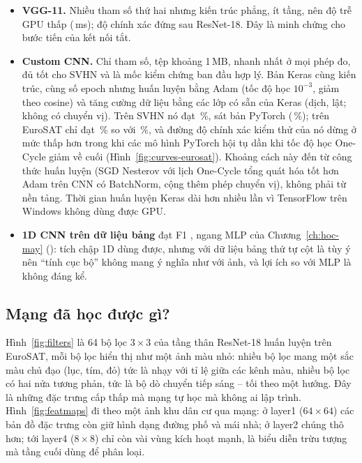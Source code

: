 \begin{itemize}
    \,ms, ResNet-18 cần \,ms. Ít FLOPs không đồng
    nghĩa nhanh hơn trên mọi phần cứng; lợi thế của MobileNet thể hiện ở CPU và thiết bị di động, nơi số phép tính mới là nút thắt.
  \item \textbf{VGG-11.} Nhiều tham số thứ hai nhưng kiến trúc phẳng, ít tầng, nên độ trễ GPU thấp
    (\,ms); độ chính xác đứng sau ResNet-18. Đây là minh chứng cho bước tiến của kết nối tắt.
  \item \textbf{Custom CNN.} Chỉ  tham số, tệp khoảng 1\,MB, nhanh nhất ở mọi phép đo, đủ tốt cho
    SVHN và là mốc kiểm chứng ban đầu hợp lý. Bản Keras cùng kiến trúc, cùng số epoch nhưng huấn luyện bằng Adam (tốc độ học
    $10^{-3}$, giảm theo cosine) và tăng cường dữ liệu bằng các lớp có sẵn của Keras (dịch, lật; không có chuyển vị). Trên SVHN
    nó đạt \,\%, sát bản PyTorch (\,\%); trên EuroSAT chỉ đạt
    \,\% so với \,\%, và đường độ chính xác kiểm thử của nó
    dừng ở mức thấp hơn trong khi các mô hình PyTorch hội tụ dần khi tốc độ học One-Cycle giảm về cuối
    (Hình~\ref{fig:curves-eurosat}). Khoảng cách này đến từ công thức huấn luyện (SGD Nesterov với lịch One-Cycle tổng quát
    hóa tốt hơn Adam trên CNN có BatchNorm, cộng thêm phép chuyển vị), không phải từ nền tảng. Thời gian huấn luyện Keras dài
    hơn nhiều lần vì TensorFlow trên Windows không dùng được GPU.
  \item \textbf{1D CNN trên dữ liệu bảng} đạt F1 , ngang MLP của Chương~\ref{ch:hoc-may}
    (): tích chập 1D dùng được, nhưng với dữ liệu bảng thứ tự cột là tùy ý nên “tính cục bộ”
    không mang ý nghĩa như với ảnh, và lợi ích so với MLP là không đáng kể.
\end{itemize}

\subsection{Mạng đã học được gì?}

Hình~\ref{fig:filters} là 64 bộ lọc $3{\times}3$ của tầng thân ResNet-18 huấn luyện trên EuroSAT, mỗi bộ lọc hiển thị như một
ảnh màu nhỏ: nhiều bộ lọc mang một sắc màu chủ đạo (lục, tím, đỏ) tức là nhạy với tỉ lệ giữa các kênh màu, nhiều bộ lọc có
hai nửa tương phản, tức là bộ dò chuyển tiếp sáng -- tối theo một hướng. Đây là những đặc trưng cấp thấp mà mạng tự học
mà không ai lập trình. Hình~\ref{fig:featmaps} đi theo một ảnh khu dân cư qua mạng: ở layer1 ($64{\times}64$) các bản đồ đặc trưng
còn giữ hình dạng đường phố và mái nhà; ở layer2 chúng thô hơn; tới layer4 ($8{\times}8$) chỉ còn vài vùng kích hoạt mạnh,
là biểu diễn trừu tượng mà tầng cuối dùng để phân loại.

